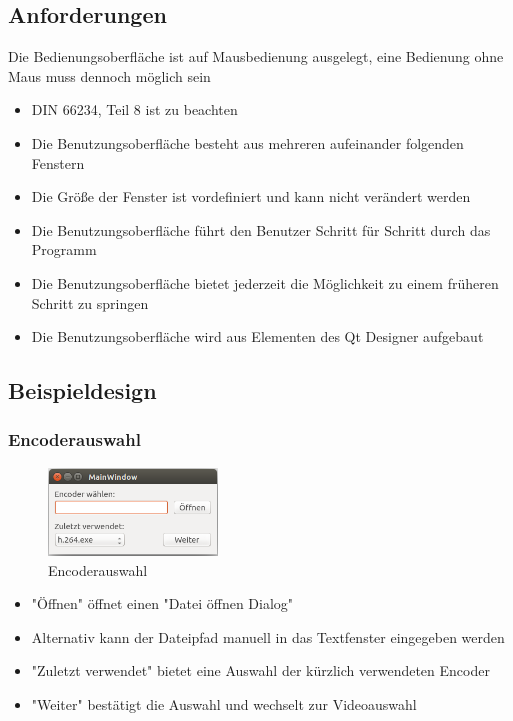 \documentclass[parskip=full]{scrartcl}
\begin{document}
\subsection{Anforderungen}
Die Bedienungsoberfläche ist auf Mausbedienung ausgelegt, eine Bedienung ohne Maus muss dennoch möglich sein
\begin{itemize}
\item DIN 66234, Teil 8 ist zu beachten
\item Die Benutzungsoberfläche besteht aus mehreren aufeinander folgenden Fenstern
\item Die Größe der Fenster ist vordefiniert und kann nicht verändert werden
\item Die Benutzungsoberfläche führt den Benutzer Schritt für Schritt durch das Programm
\item Die Benutzungsoberfläche bietet jederzeit die Möglichkeit zu einem früheren Schritt zu springen
\item Die Benutzungsoberfläche wird aus Elementen des Qt Designer aufgebaut
\end{itemize}
\subsection{Beispieldesign}
\subsubsection{Encoderauswahl}
\begin{figure}[htbp] 
\centering
\includegraphics[width=0.4\textwidth]{GUI_Entwurf_1/GUI_1.png}
\caption{Encoderauswahl}
\end{figure}
\begin{itemize}
\item "Öffnen" öffnet einen "Datei öffnen Dialog"
\item Alternativ kann der Dateipfad manuell in das Textfenster eingegeben werden
\item "Zuletzt verwendet" bietet eine Auswahl der kürzlich verwendeten Encoder
\item "Weiter" bestätigt die Auswahl und wechselt zur Videoauswahl
\end{itemize}
\end{document}
